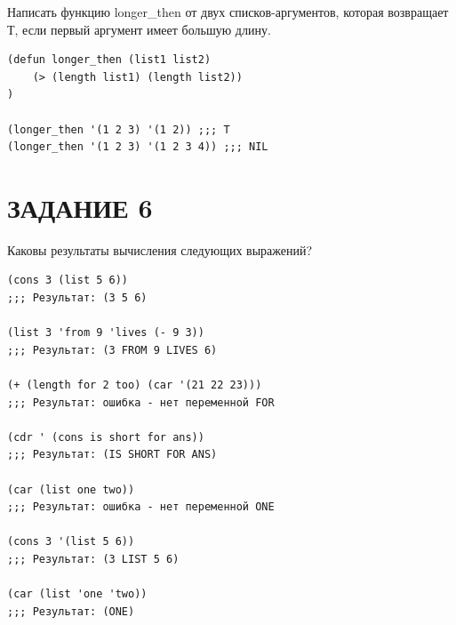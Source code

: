 Написать функцию longer\_then от двух списков-аргументов,
которая возвращает Т, если первый аргумент имеет большую длину.

\begin{lstlisting}
(defun longer_then (list1 list2)
    (> (length list1) (length list2))
)

(longer_then '(1 2 3) '(1 2)) ;;; T
(longer_then '(1 2 3) '(1 2 3 4)) ;;; NIL
\end{lstlisting}

\section{ЗАДАНИЕ 6}

Каковы результаты вычисления следующих выражений?

\begin{lstlisting}
(cons 3 (list 5 6))
;;; Результат: (3 5 6)

(list 3 'from 9 'lives (- 9 3))
;;; Результат: (3 FROM 9 LIVES 6)

(+ (length for 2 too) (car '(21 22 23)))
;;; Результат: ошибка - нет переменной FOR

(cdr ' (cons is short for ans))
;;; Результат: (IS SHORT FOR ANS)

(car (list one two))
;;; Результат: ошибка - нет переменной ONE

(cons 3 '(list 5 6))
;;; Результат: (3 LIST 5 6)

(car (list 'one 'two))
;;; Результат: (ONE)
\end{lstlisting}
